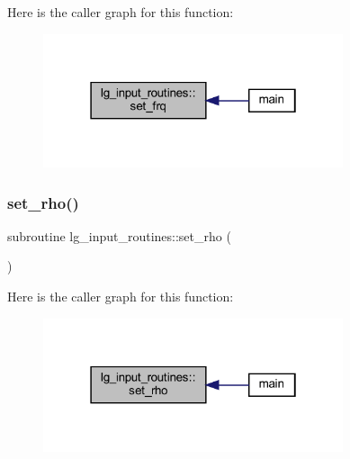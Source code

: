 Here is the caller graph for this function\+:\nopagebreak
\begin{figure}[H]
\begin{center}
\leavevmode
\includegraphics[width=250pt]{namespacelg__input__routines_a836674acd30d52d3aa973722014aaa9f_icgraph}
\end{center}
\end{figure}
\mbox{\label{namespacelg__input__routines_a74107bd43614b32d8679e91def53e94d}} 
\subsubsection{\texorpdfstring{set\+\_\+rho()}{set\_rho()}}
{\footnotesize\ttfamily subroutine lg\+\_\+input\+\_\+routines\+::set\+\_\+rho (\begin{DoxyParamCaption}{ }\end{DoxyParamCaption})}

Here is the caller graph for this function\+:\nopagebreak
\begin{figure}[H]
\begin{center}
\leavevmode
\includegraphics[width=250pt]{namespacelg__input__routines_a74107bd43614b32d8679e91def53e94d_icgraph}
\end{center}
\end{figure}
\mbox{\label{namespacelg__input__routines_aff8e77512771c5a25793784a8185d5b0}} 
